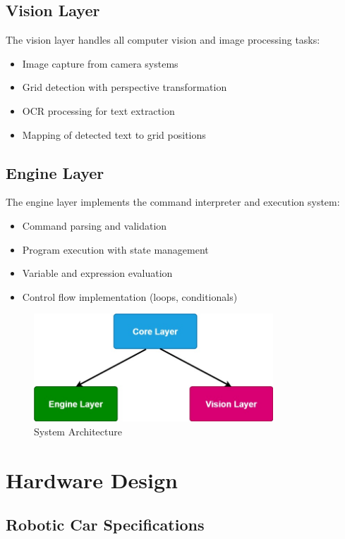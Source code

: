 \subsection{Vision Layer}
The vision layer handles all computer vision and image processing tasks:
\begin{itemize}
    \item Image capture from camera systems
    \item Grid detection with perspective transformation
    \item OCR processing for text extraction
    \item Mapping of detected text to grid positions
\end{itemize}

\subsection{Engine Layer}
The engine layer implements the command interpreter and execution system:
\begin{itemize}
    \item Command parsing and validation
    \item Program execution with state management
    \item Variable and expression evaluation
    \item Control flow implementation (loops, conditionals)
\end{itemize}

\begin{figure}[H]
    \centering
    \includegraphics[width=0.8\textwidth]{assets/System_Arch.jpg}
    \caption{System Architecture}
    \label{fig:system_architecture}
\end{figure}

\section{Hardware Design}

\subsection{Robotic Car Specifications}

